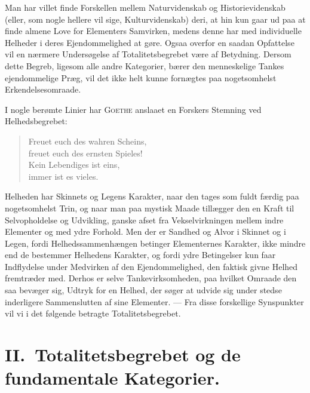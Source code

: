 \documentclass[12pt]{article}
\newcommand{\opage}[1]{\marginnote{\footnotesize\textit{[#1]}}}
\begin{document}
Man har villet finde Forskellen mellem Naturvidenskab og Historievidenskab
(eller, som nogle hellere vil sige, Kulturvidenskab) deri, at hin kun gaar ud paa
at finde almene Love for Elementers Samvirken, medens denne har med
individuelle Helheder i deres Ejendommelighed at gøre. Ogsaa overfor en saadan
Opfattelse vil en nærmere Undersøgelse af Totalitetsbegrebet være af Betydning. Dersom
dette Begreb, ligesom alle andre Kategorier, bærer den menneskelige Tankes
ejendommelige Præg, vil det ikke helt kunne fornægtes paa nogetsomhelst
Erkendelsesomraade.

I nogle berømte Linier har \textsc{Goethe} anslaaet en Forskers Stemning ved
Helhedsbegrebet:
\begin{verse}
Freuet euch des wahren Scheins,\\
freuet euch des ernsten Spieles!\\
Kein Lebendiges ist eins,\\
immer ist es vieles.
\end{verse}

Helheden har Skinnets og Legens Karakter, naar den tages som fuldt færdig
paa nogetsomhelst Trin, og naar man paa mystisk Maade tillægger den en Kraft
til Selvopholdelse og Udvikling, ganske afset fra Vekselvirkningen mellem indre
Elementer og med ydre Forhold. Men der er Sandhed og Alvor i Skinnet og i
\opage{23}Legen, fordi Helhedssammenhængen betinger Elementernes Karakter, ikke mindre
end de bestemmer Helhedens Karakter, og fordi ydre Betingelser kun faar
Indflydelse under Medvirken af den Ejendommelighed, den faktisk givne Helhed
fremtræder med. Derhos er selve Tankevirksomheden, paa hvilket Omraade den saa
bevæger sig, Udtryk for en Helhed, der søger at udvide sig under stedse
inderligere Sammenslutten af sine Elementer. --- Fra disse forskellige Synspunkter vil
vi i det følgende betragte Totalitetsbegrebet.

\section*{II.\ Totalitetsbegrebet og de fundamentale Kategorier.}
\end{document}
